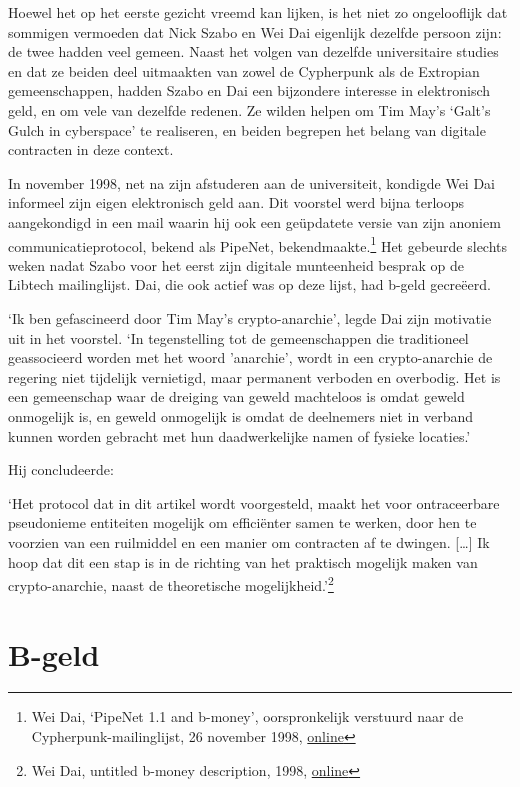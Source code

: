 \documentclass[smalldemyvopaper,11pt,twoside,onecolumn,openright,extrafontsizes,hidelinks]{memoir}
\begin{document}
Hoewel het op het eerste gezicht vreemd kan lijken, is het niet zo
ongelooflijk dat sommigen vermoeden dat Nick Szabo en Wei Dai eigenlijk
dezelfde persoon zijn: de twee hadden veel gemeen. Naast het volgen van
dezelfde universitaire studies en dat ze beiden deel uitmaakten van
zowel de Cypherpunk als de Extropian gemeenschappen, hadden Szabo en Dai
een bijzondere interesse in elektronisch geld, en om vele van dezelfde
redenen. Ze wilden helpen om Tim May's `Galt's Gulch in cyberspace' te
realiseren, en beiden begrepen het belang van digitale contracten in
deze context.

In november 1998, net na zijn afstuderen aan de universiteit, kondigde
Wei Dai informeel zijn eigen elektronisch geld aan. Dit voorstel werd
bijna terloops aangekondigd in een mail waarin hij ook een geüpdatete
versie van zijn anoniem communicatieprotocol, bekend als PipeNet,
bekendmaakte.\footnote{Wei Dai, `PipeNet 1.1 and b-money',
  oorspronkelijk verstuurd naar de Cypherpunk-mailinglijst, 26 november
  1998,
  \href{https://cypherpunks.venona.com/date/1998/11/msg00941.html}{online}}
Het gebeurde slechts weken nadat Szabo voor het eerst zijn digitale
munteenheid besprak op de Libtech mailinglijst. Dai, die ook actief was
op deze lijst, had b-geld gecreëerd.

`Ik ben gefascineerd door Tim May's crypto-anarchie', legde Dai zijn
motivatie uit in het voorstel. `In tegenstelling tot de gemeenschappen
die traditioneel geassocieerd worden met het woord 'anarchie', wordt in
een crypto-anarchie de regering niet tijdelijk vernietigd, maar
permanent verboden en overbodig. Het is een gemeenschap waar de dreiging
van geweld machteloos is omdat geweld onmogelijk is, en geweld
onmogelijk is omdat de deelnemers niet in verband kunnen worden gebracht
met hun daadwerkelijke namen of fysieke locaties.'

Hij concludeerde:

`Het protocol dat in dit artikel wordt voorgesteld, maakt het voor
ontraceerbare pseudonieme entiteiten mogelijk om efficiënter samen te
werken, door hen te voorzien van een ruilmiddel en een manier om
contracten af te dwingen. {[}\ldots{]} Ik hoop dat dit een stap is in de
richting van het praktisch mogelijk maken van crypto-anarchie, naast de
theoretische mogelijkheid.'\footnote{Wei Dai, untitled b-money
  description, 1998,
  \href{https://web.archive.org/web/20090415130807/https://www.weidai.com/bmoney.txt}{online}}

\section{B-geld}\label{b-geld}
\end{document}

